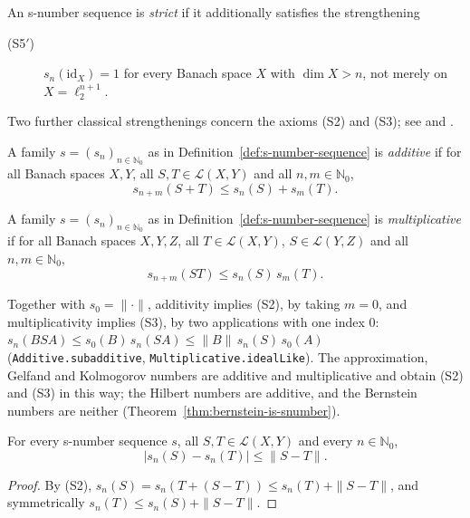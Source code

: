 \begin{definition}
\label{def:strict-s-number-sequence}
\leanok
{}
An s-number sequence is \emph{strict} if it additionally satisfies the
strengthening
\begin{description}
  \item[(S5$'$)] $s_n(\mathrm{id}_X) = 1$ for every Banach space $X$ with
        $\dim X > n$, not merely on $X = \ell_2^{n+1}$.
\end{description}
\end{definition}

Two further classical strengthenings concern the axioms (S2) and (S3); see
\cite{Pietsch-s} and \cite[Section~5.1]{LE11}.

\begin{definition}
\label{def:additive-sequence}
\leanok
{}
A family $s = (s_n)_{n \in \mathbb{N}_0}$ as in
Definition~\ref{def:s-number-sequence} is \emph{additive} if for all Banach
spaces $X, Y$, all $S, T \in \mathcal{L}(X, Y)$ and all
$n, m \in \mathbb{N}_0$,
\[
  s_{n+m}(S + T) \le s_n(S) + s_m(T).
\]
\end{definition}

\begin{definition}
\label{def:multiplicative-sequence}
\leanok
{}
A family $s = (s_n)_{n \in \mathbb{N}_0}$ as in
Definition~\ref{def:s-number-sequence} is \emph{multiplicative} if for all
Banach spaces $X, Y, Z$, all $T \in \mathcal{L}(X, Y)$,
$S \in \mathcal{L}(Y, Z)$ and all $n, m \in \mathbb{N}_0$,
\[
  s_{n+m}(S T) \le s_n(S) \, s_m(T).
\]
\end{definition}

Together with $s_0 = \|\cdot\|$, additivity implies (S2), by taking $m = 0$,
and multiplicativity implies (S3), by two applications with one index $0$:
$s_n(BSA) \le s_0(B) \, s_n(SA) \le \|B\| \, s_n(S) \, s_0(A)$
(\texttt{Additive.subadditive},
\texttt{Multiplicative.idealLike}). The
approximation, Gelfand and Kolmogorov numbers are additive and
multiplicative and obtain (S2) and (S3) in this way; the Hilbert numbers are
additive, and the Bernstein numbers are neither
(Theorem~\ref{thm:bernstein-is-snumber}).

\begin{lemma}
\label{lem:sn-lipschitz}
\leanok
{}
For every s-number sequence $s$, all $S, T \in \mathcal{L}(X, Y)$ and every
$n \in \mathbb{N}_0$,
\[
  |s_n(S) - s_n(T)| \le \|S - T\| .
\]
\end{lemma}
\begin{proof}
\leanok
By (S2), $s_n(S) = s_n(T + (S - T)) \le s_n(T) + \|S - T\|$, and symmetrically
$s_n(T) \le s_n(S) + \|S - T\|$.
\end{proof}

